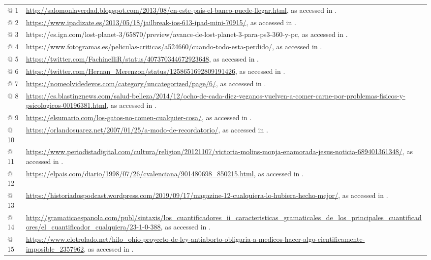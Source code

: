 \begin{tabularx}{\textwidth}{XX}
\lsptoprule
@ 1 & \url{http://salomonlaverdad.blogspot.com/2013/08/en-este-pais-el-banco-puede-llegar.html}, as accessed in \citealt{Februar2021}.\\
@ 2 & \url{https://www.ipadizate.es/2013/05/18/jailbreak-ios-613-ipad-mini-70915/}, as accessed in \citealt{Februar2020}.\\
@ 3 & https://es.ign.com/lost-planet-3/65870/preview/avance-de-lost-planet-3-para-ps3-360-y-pc, as accessed in \citealt{June2021}.\\
@ 4 & https://www.fotogramas.es/peliculas-criticas/a524660/cuando-todo-esta-perdido/, as accessed in \citealt{June2021}.\\
@ 5 & \url{https://twitter.com/FachinelliR/status/407370344672923648}, as accessed in \citealt{May2021}.\\
@ 6 & \url{https://twitter.com/Hernan_Merenzon/status/1258651692809191426}, as accessed in \citealt{May2021}.\\
@ 7 & \url{https://nomeolvidedevos.com/category/uncategorized/page/6/}, as accessed in \citealt{May2021}.\\
@ 8 & \url{https://es.blastingnews.com/salud-belleza/2014/12/ocho-de-cada-diez-veganos-vuelven-a-comer-carne-por-problemas-fisicos-y-psicologicos-00196381.html}, as accessed in \citealt{Februar2020}.\\
@ 9 & \url{https://elsumario.com/los-gatos-no-comen-cualquier-cosa/}, as accessed in \citealt{May2021}.\\
@ 10 & \url{https://orlandosuarez.net/2007/01/25/a-modo-de-recordatorio/}, as accessed in \citealt{May2021}.\\
@ 11 & \url{https://www.periodistadigital.com/cultura/religion/20121107/victoria-molins-monja-enamorada-jesus-noticia-689401361348/}, as accessed in \citealt{May2021}.\\
@ 12 & \url{https://elpais.com/diario/1998/07/26/cvalenciana/901480698_850215.html}, as accessed in \citealt{December2020}. \\
@ 13 & \url{https://historiadospodcast.wordpress.com/2019/09/17/magazine-12-cualquiera-lo-hubiera-hecho-mejor/}, as accessed in \citealt{December2020}.\\
@ 14 & \url{http://gramaticaespanola.com/publ/sintaxis/los_cuantificadores_ii_caracteristicas_gramaticales_de_los_principales_cuantificadores/el_cuantificador_cualquiera/23-1-0-388}, as accessed in \citealt{December2020}.\\
@ 15 & \url{https://www.elotrolado.net/hilo_ohio-proyecto-de-ley-antiaborto-obligaria-a-medicos-hacer-algo-cientificamente-imposible_2357962}, as accessed in \citealt{December2020}.\\

\end{tabularx}

